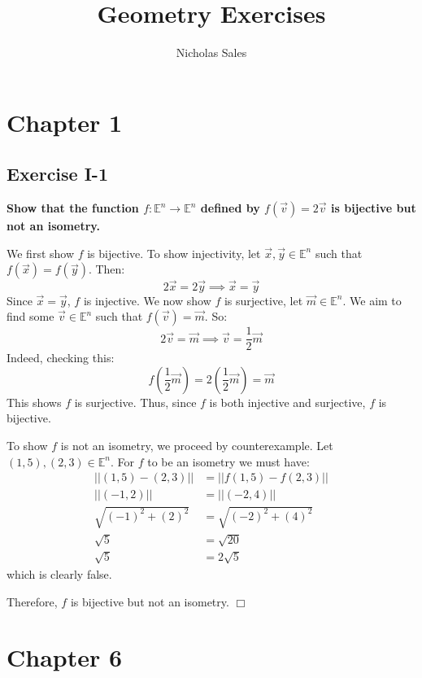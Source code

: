 \documentclass[11pt, a4paper]{article}
\title{Geometry Exercises}
\author{Nicholas Sales}
\date{}
\begin{document}
\maketitle 
\tableofcontents

\newpage

\section{Chapter 1}

\subsection{Exercise I-1}

\textbf{Show that the function $f : \mathbb{E}^n \rightarrow \mathbb{E}^n$ defined by $f(\vec{v}) = 2 \vec{v}$ is bijective but not an isometry.}

We first show $f$ is bijective. To show injectivity, let $\vec{x}, \vec{y} \in \mathbb{E}^n$ such that $f(\vec{x}) = f(\vec{y})$. Then:
\begin{equation*}
  2 \vec{x} = 2 \vec{y} \implies \vec{x} = \vec{y}
\end{equation*}
Since $\vec{x} = \vec{y}$, $f$ is injective. We now show $f$ is surjective, let $\vec{m} \in \mathbb{E}^n$. We aim to find some $\vec{v} \in \mathbb{E}^n$ such that $f(\vec{v}) = \vec{m}$. So:
\begin{equation*}
  2 \vec{v} = \vec{m} \implies \vec{v} = \frac{1}{2} \vec{m}
\end{equation*}
Indeed, checking this:
\begin{equation*}
  f \left ( \frac{1}{2} \vec{m} \right ) = 2 \left ( \frac{1}{2} \vec{m} \right ) = \vec{m}
\end{equation*}
This shows $f$ is surjective. Thus, since $f$ is both injective and surjective, $f$ is bijective.

To show $f$ is not an isometry, we proceed by counterexample. Let $(1, 5), (2, 3) \in \mathbb{E}^n$. For $f$ to be an isometry we must have:
\begin{align*}
  || (1, 5) - (2, 3) || &= || f(1, 5) - f(2, 3) || \\
  || (-1, 2) ||         &= || (-2, 4) || \\
  \sqrt{(-1)^2 + (2)^2} &= \sqrt{(-2)^2 + (4)^2} \\
  \sqrt{5}              &= \sqrt {20} \\
  \sqrt{5}              &= 2 \sqrt {5}
\end{align*}
which is clearly false. 

Therefore, $f$ is bijective but not an isometry. $\Box$

\section{Chapter 6}
\end{document}
